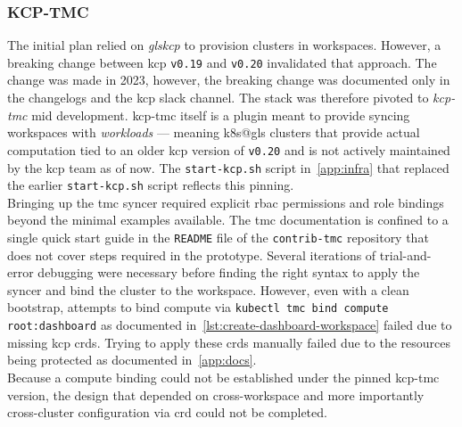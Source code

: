 \documentclass[11pt, a4paper, oneside, listof=totoc]{scrartcl}
\begin{document}
            \subsubsection{KCP-TMC}\label{subsubsec:challengesKCPTMC}
                The initial plan relied on \emph{gls{kcp}} to provision clusters in workspaces.
                However, a breaking change between \gls{kcp} \texttt{v0.19} and \texttt{v0.20}
                invalidated that approach.
                The change was made in 2023, however, the breaking change was documented only in
                the changelogs and the \gls{kcp} slack channel.
                The stack was therefore pivoted to \emph{\gls{kcp}-\gls{tmc}} mid development.
                \gls{kcp}-\gls{tmc} itself is a plugin meant to provide syncing workspaces with
                \textit{workloads} --- meaning \gls{k8s@gls} clusters that provide actual
                computation tied to an older \gls{kcp} version of \texttt{v0.20} and is not actively
                maintained by the \gls{kcp} team as of now.
                The \texttt{start-kcp.sh} script in~\autoref{app:infra} that replaced the earlier
                \texttt{start-kcp.sh} script reflects this pinning.\\
                Bringing up the \gls{tmc} syncer required explicit \gls{rbac} permissions and
                role bindings beyond the minimal examples available.
                The \gls{tmc} documentation is confined to a single quick start guide in the
                \texttt{README} file of the \texttt{contrib-tmc} repository that does not cover
                steps required in the prototype.
                Several iterations of trial-and-error debugging were necessary before finding the
                right syntax to apply the syncer and bind the cluster to the workspace.
                However, even with a clean bootstrap, attempts to bind compute via
                \texttt{kubectl tmc bind compute root:dashboard} as documented
                in~\autoref{lst:create-dashboard-workspace} failed due to missing \gls{kcp}
                \glspl{crd}.
                Trying to apply these \glspl{crd} manually failed due to the resources being
                protected as documented in~\autoref{app:docs}.\\
                Because a compute binding could not be established under the pinned
                \gls{kcp}-\gls{tmc} version, the design that depended on cross-workspace and more
                importantly cross-cluster configuration via \gls{crd} could not be completed.
\end{document}
